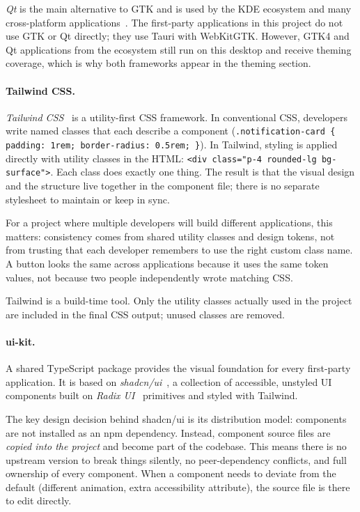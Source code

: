 \emph{Qt} is the main alternative to GTK and is used by the KDE ecosystem and
many cross-platform applications~\cite{qt}. The first-party applications in
this project do not use GTK or Qt directly; they use Tauri with WebKitGTK.
However, GTK4 and Qt applications from the ecosystem still run on this desktop
and receive theming coverage, which is why both frameworks appear in the theming
section.

\paragraph{Tailwind CSS.}
\emph{Tailwind CSS}~\cite{tailwind} is a utility-first CSS framework. In
conventional CSS, developers write named classes that each describe a component
(\texttt{.notification-card \{ padding: 1rem; border-radius: 0.5rem; \}}). In
Tailwind, styling is applied directly with utility classes in the HTML:
\texttt{<div class="p-4 rounded-lg bg-surface">}. Each class does exactly one
thing. The result is that the visual design and the structure live together in
the component file; there is no separate stylesheet to maintain or keep in sync.

For a project where multiple developers will build different applications, this
matters: consistency comes from shared utility classes and design tokens, not
from trusting that each developer remembers to use the right custom class name.
A button looks the same across applications because it uses the same token
values, not because two people independently wrote matching CSS.

Tailwind is a build-time tool. Only the utility classes actually used in the
project are included in the final CSS output; unused classes are removed.

\paragraph{ui-kit.}
A shared TypeScript package provides the visual foundation for every
first-party application. It is based on \emph{shadcn/ui}~\cite{shadcn},
a collection of accessible, unstyled UI components built on
\emph{Radix UI}~\cite{radix} primitives and styled with Tailwind.

The key design decision behind shadcn/ui is its distribution model: components
are not installed as an npm dependency. Instead, component source files are
\emph{copied into the project} and become part of the codebase. This means
there is no upstream version to break things silently, no peer-dependency
conflicts, and full ownership of every component. When a component needs to
deviate from the default (different animation, extra accessibility attribute),
the source file is there to edit directly.

